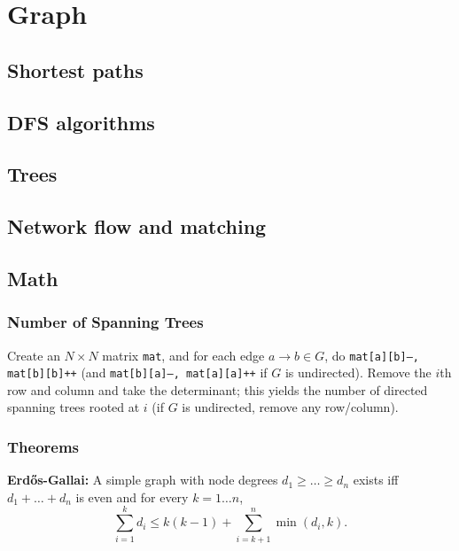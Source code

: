 \chapter{Graph}

\section{Shortest paths}

\section{DFS algorithms}

\section{Trees}

\section{Network flow and matching}

\section{Math}
	\subsection{Number of Spanning Trees}
		Create an $N\times N$ matrix \texttt{mat}, and for each edge $a \rightarrow b \in G$, do
		\texttt{mat[a][b]--, mat[b][b]++} (and \texttt{mat[b][a]--, mat[a][a]++} if $G$ is undirected).
		Remove the $i$th row and column and take the determinant; this yields the number of directed spanning trees rooted at $i$
		(if $G$ is undirected, remove any row/column).

	\subsection{Theorems}
	\textbf{Erdős-Gallai:} A simple graph with node degrees $d_1 \ge \dots \ge d_n$ exists iff $d_1 + \dots + d_n$ is even and for every $k = 1\dots n$,
	\[ \sum _{i=1}^{k}d_{i}\leq k(k-1)+\sum _{i=k+1}^{n}\min(d_{i},k). \]

